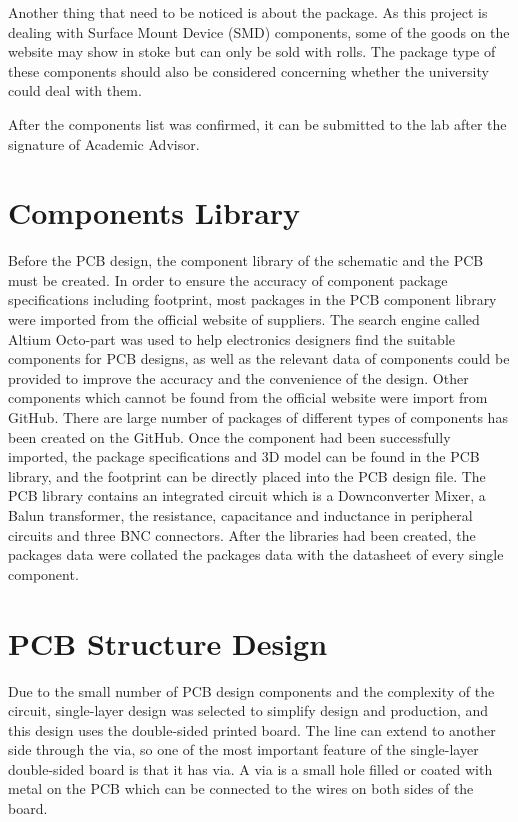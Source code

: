 \documentclass[12pt, a4paper]{report}
\begin{document}
Another thing that need to be noticed is about the package. As this project is dealing with Surface Mount Device (SMD) components, some of the goods on the website may show in stoke but can only be sold with rolls. The package type of these components should also be considered concerning whether the university could deal with them.

After the components list was confirmed, it can be submitted to the lab after the signature of Academic Advisor.


\section{Components Library}

Before the PCB design, the component library of the schematic and the PCB must be created. In order to ensure the accuracy of component package specifications including footprint, most packages in the PCB component library were imported from the official website of suppliers. The search engine called Altium Octo-part was used to help electronics designers find the suitable components for PCB designs, as well as the relevant data of components could be provided to improve the accuracy and the convenience of the design. Other components which cannot be found from the official website were import from GitHub. There are large number of packages of different types of components has been created on the GitHub. Once the component had been successfully imported, the package specifications and 3D model can be found in the PCB library, and the footprint can be directly placed into the PCB design file. The PCB library contains an integrated circuit which is a Downconverter Mixer, a Balun transformer, the resistance, capacitance and inductance in peripheral circuits and three BNC connectors. After the libraries had been created, the packages data were collated the packages data with the datasheet of every single component.

\section{PCB Structure Design}

Due to the small number of PCB design components and the complexity of the circuit, single-layer design was selected to simplify design and production, and this design uses the double-sided printed board. The line can extend to another side through the via, so one of the most important feature of the single-layer double-sided board is that it has via. A via is a small hole filled or coated with metal on the PCB which can be connected to the wires on both sides of the board.
\end{document}
